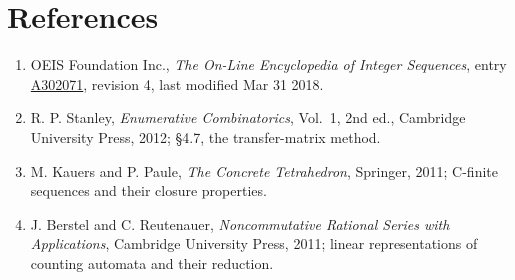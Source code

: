 \documentclass[11pt]{article}
\theoremstyle{definition}
\begin{document}
\section{References}

\begin{enumerate}

\item OEIS Foundation Inc., \emph{The On-Line Encyclopedia of Integer Sequences}, entry \href{https://oeis.org/A302071}{A302071}, revision 4, last modified Mar 31 2018.

\item R. P. Stanley, \emph{Enumerative Combinatorics}, Vol.~1, 2nd ed., Cambridge University Press, 2012; \S4.7, the transfer-matrix method.

\item M. Kauers and P. Paule, \emph{The Concrete Tetrahedron}, Springer, 2011; C-finite sequences and their closure properties.

\item J. Berstel and C. Reutenauer, \emph{Noncommutative Rational Series with Applications}, Cambridge University Press, 2011; linear representations of counting automata and their reduction.

\end{enumerate}
\end{document}
